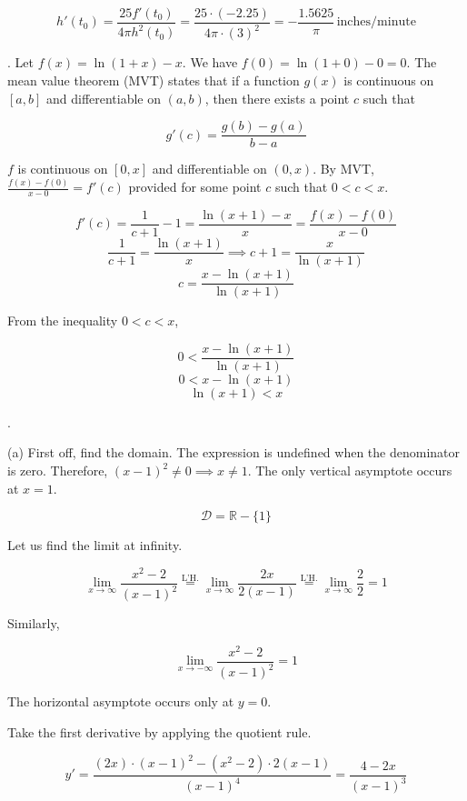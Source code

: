 \documentclass{article}
\begin{document}
\[h'(t_0)=\frac{25f'(t_0)}{4\pi h^2(t_0)}=\frac{25\cdot(-2.25)}{4\pi\cdot(3)^2}=\boxed{-\frac{1.5625}\pi\,\text{inches/minute}}\]

\hfill

. Let $f(x) = \ln(1+x)-x$. We have $f(0) = \ln(1 + 0) - 0 = 0$. The mean value theorem (MVT) states that if a function $g(x)$ is continuous on $[a, b]$ and differentiable on $(a,b)$, then there exists a point $c$ such that

\[
g'(c) = \frac{g(b)-g(a)}{b-a}
\]

\hfill

\noindent $f$ is continuous on $[0,x]$ and differentiable on $(0,x)$. By MVT, $\displaystyle\frac{f(x)-f(0)}{x-0}=f'(c)$ provided for some point $c$ such that $0<c<x$.

\[f'(c)=\frac1{c+1}-1=\frac{\ln(x+1) - x}x=\frac{f(x)-f(0)}{x-0}\]
\[\frac1{c+1}=\frac{\ln(x+1) }x\implies c+1 = \frac x{\ln(x+1)}\]
\[c=\frac{x-\ln(x+1)}{\ln(x+1)}\]

\hfill

\noindent From the inequality $0<c<x$,

\[0<\frac{x-\ln(x+1)}{\ln(x+1)}\]
\[0<x-\ln(x+1)\]
\[\ln(x+1)<x\]

\newpage

.

\hfill

\noindent (a) First off, find the domain. The expression is undefined when the denominator is zero. Therefore, $(x-1)^2\neq0\implies x\neq1$. The only vertical asymptote occurs at $x=1$.

\[\mathcal{D}=\mathbb{R}-\{1\}\]

\hfill

\noindent Let us find the limit at infinity.

\[\lim_{x\to \infty}\frac{x^2-2}{(x-1)^2} \overset{\text{L'H.}}{=} \lim_{x\to \infty} \frac{2x}{2(x-1)} \overset{\text{L'H.}}{=} \lim_{x\to \infty} \frac{2}{2}=1\]

\noindent Similarly,

\[\lim_{x\to -\infty}\frac{x^2-2}{(x-1)^2}=1\]

\hfill

\noindent The horizontal asymptote occurs only at $y=0$.

\hfill

\noindent Take the first derivative by applying the quotient rule.

\[y'=\frac{(2x)\cdot(x-1)^2-(x^2-2)\cdot 2(x-1)}{(x-1)^4}=\frac{4-2x}{(x-1)^3}\]
\end{document}
